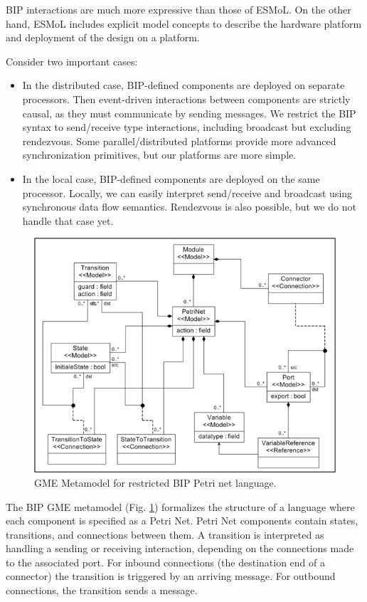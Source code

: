 BIP interactions are much more expressive than those of ESMoL.  On the other hand, ESMoL includes explicit model concepts to describe the hardware platform and deployment of the design on a platform.

Consider two important cases:

\begin{itemize}
\item In the distributed case, BIP-defined components are deployed on separate processors.  Then event-driven interactions between components are strictly causal, as they must communicate by sending messages.  We restrict the BIP syntax to send/receive type interactions, including broadcast but excluding rendezvous. Some parallel/distributed platforms provide more advanced synchronization primitives, but our platforms are more simple.
\item In the local case, BIP-defined components are deployed on the same processor.  Locally, we can easily interpret send/receive and broadcast using synchronous data flow semantics.  Rendezvous is also possible, but we do not handle that case yet.
\end{itemize}

\begin{figure}[htb]
	\centering
		\includegraphics[width=1.00\columnwidth]{images/bip_gme_meta.png}
	\caption{GME Metamodel for restricted BIP Petri net language.}
	\label{fig:bip_gme_meta}
\end{figure}

The BIP GME metamodel (Fig. \ref{fig:bip_gme_meta}) formalizes the structure of a language where each component is specified as a Petri Net.  Petri Net components contain states, transitions, and connections between them. A transition is interpreted as handling a sending or receiving interaction, depending on the connections made to the associated port.  For inbound connections (the destination end of a connector) the transition is triggered by an arriving message.  For outbound connections, the transition sends a message.  

